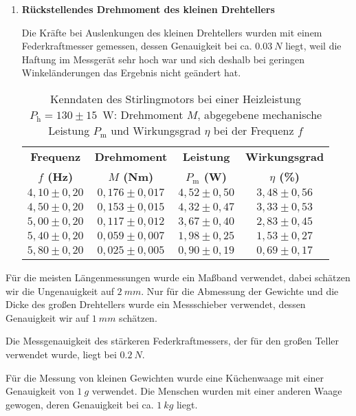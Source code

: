 \documentclass[a4paper,11pt]{article}
\begin{document}
\begin{enumerate}
\item \textbf{Rückstellendes Drehmoment des kleinen Drehtellers}

Die Kräfte bei Auslenkungen des kleinen Drehtellers wurden mit einem Federkraftmesser gemessen, dessen Genauigkeit bei ca. $\SI{0.03}{N}$ liegt, weil die Haftung im Messgerät sehr hoch war und sich deshalb bei geringen Winkeländerungen das Ergebnis nicht geändert hat.
\begin{table}
\begin{center}
\begin{tabular}{cccc}\hline
\textbf{Frequenz} & \textbf{Drehmoment} & \textbf{Leistung} & \textbf{Wirkungsgrad} \\
\textbf{$f$ (Hz)} & \textbf{$M$ (Nm)} & \textbf{$P_\mathrm{m}$ (W)} & \textbf{$\eta$ (\%)} \\
\hline
$4,10\pm 0,20$ & $0,176\pm 0,017$ & $4,52\pm 0,50$ & $3,48\pm 0,56$ \\
$4,50\pm 0,20$ & $0,153\pm 0,015$ & $4,32\pm 0,47$ & $3,33\pm 0,53$ \\
$5,00\pm 0,20$ & $0,117\pm 0,012$ & $3,67\pm 0,40$ & $2,83\pm 0,45$ \\
$5,40\pm 0,20$ & $0,059\pm 0,007$ & $1,98\pm 0,25$ & $1,53\pm 0,27$ \\
$5,80\pm 0,20$ & $0,025\pm 0,005$ & $0,90\pm 0,19$ & $0,69\pm 0,17$ \\\hline
\end{tabular}
\caption{\label{tab:DrehmomentKlein}Kenndaten des Stirlingmotors bei einer Heizleistung
    $P_\mathrm{h}=130\pm 15$~W: Drehmoment $M$, abgegebene mechanische Leistung
    $P_\mathrm{m}$ und Wirkungsgrad $\eta$ bei der Frequenz $f$}
\end{center}
\end{table}
\end{enumerate}


Für die meisten Längenmessungen wurde ein Maßband verwendet, dabei schätzen wir die Ungenauigkeit auf $\SI{2}{mm}$. Nur für die Abmessung der Gewichte und die Dicke des großen Drehtellers wurde ein Messschieber verwendet, dessen Genauigkeit wir auf $\SI{1}{mm}$ schätzen.

Die Messgenauigkeit des stärkeren Federkraftmessers, der für den großen Teller verwendet wurde, liegt bei $\SI{0.2}{N}$.

Für die Messung von kleinen Gewichten wurde eine Küchenwaage mit einer Genauigkeit von $\SI{1}{g}$ verwendet. Die Menschen wurden mit einer anderen Waage gewogen, deren Genauigkeit bei ca. $\SI{1}{kg}$ liegt.
\end{document}
